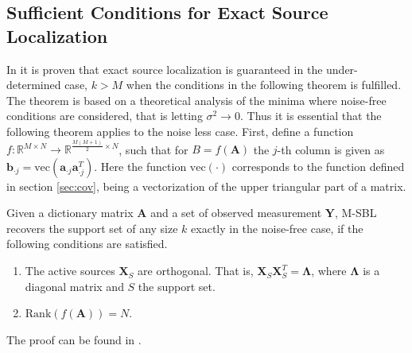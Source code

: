\subsection{Sufficient Conditions for Exact Source Localization}
In \cite{Balkan2014} it is proven that exact source localization is guaranteed in the under-determined case, $k > M$ when the conditions in the following theorem is fulfilled.
The theorem is based on a theoretical analysis of the minima where noise-free conditions are considered, that is letting $\sigma^2 \rightarrow 0$. Thus it is essential that the following theorem applies to the noise less case.   
First, define a function $f:\mathbb{R}^{M \times N} \rightarrow \mathbb{R}^{\frac{M(M+1)}{2}\times N}$, such that for $B = f(\mathbf{A})$ the $j$-th column is given as $\mathbf{b}_{\cdot j} = \text{vec}(\mathbf{a}_{\cdot j}\mathbf{a}_{\cdot j}^T)$. Here the function $\text{vec}(\cdot)$ corresponds to the function defined in section \ref{sec:cov}, being a vectorization of the upper triangular part of a matrix.	
\begin{theorem}
Given a dictionary matrix $\mathbf{A}$ and a set of observed measurement $\mathbf{Y}$, M-SBL recovers the support set of any size $k$ exactly in the noise-free case, if the following conditions are satisfied. 
\begin{enumerate}
\item The active sources $\mathbf{X}_S$ are orthogonal. That is, $\mathbf{X}_S \mathbf{X}_S^T = \boldsymbol{\Lambda}$, where $\boldsymbol{\Lambda}$ is a diagonal matrix and $S$ the support set.
\item $\text{Rank}(f(\mathbf{A}))= N$.
\end{enumerate}
The proof can be found in \cite[p. 16]{Balkan2014}.


\label{th:conditions}
\end{theorem}  

